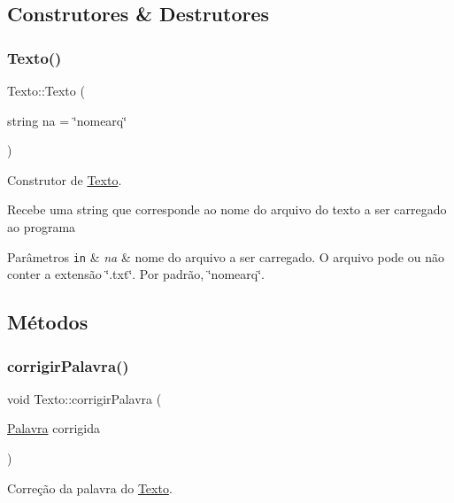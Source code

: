 \subsection{Construtores \& Destrutores}
\mbox{\label{classTexto_a994cfaf08f49b74b55c2ff8e637a496c}} 
\subsubsection{\texorpdfstring{Texto()}{Texto()}}
{\footnotesize\ttfamily Texto\+::\+Texto (\begin{DoxyParamCaption}\item[{string}]{na = {\ttfamily \char`\"{}nomearq\char`\"{}} }\end{DoxyParamCaption})}



Construtor de \hyperlink{classTexto}{Texto}. 

Recebe uma string que corresponde ao nome do arquivo do texto a ser carregado ao programa 
\begin{DoxyParams}[1]{Parâmetros}
\mbox{\tt in}  & {\em na} & nome do arquivo a ser carregado. O arquivo pode ou não conter a extensão \char`\"{}.\+txt\char`\"{}. Por padrão, \char`\"{}nomearq\char`\"{}. \\
\hline
\end{DoxyParams}


\subsection{Métodos}
\mbox{\label{classTexto_a22a609901801895bd761ea85f0111b19}} 
\subsubsection{\texorpdfstring{corrigir\+Palavra()}{corrigirPalavra()}}
{\footnotesize\ttfamily void Texto\+::corrigir\+Palavra (\begin{DoxyParamCaption}\item[{\hyperlink{classPalavra}{Palavra}}]{corrigida }\end{DoxyParamCaption})}



Correção da palavra do \hyperlink{classTexto}{Texto}. 

